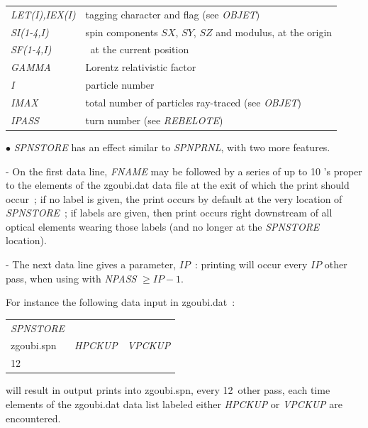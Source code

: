 \medskip

 \begin{tabular}{>{\sl}l!{~:}l}
	 LET(I),IEX(I)  &  tagging character and flag (see \textsl{OBJET}) \\   
	 SI(1-4,I) & spin components $SX$, $SY$, $SZ$  and modulus, at the origin\\
	 SF(1-4,I)   &  \id\, at the current position\\
	  GAMMA &   Lorentz relativistic factor\\
	  I  &  particle number\\
	 IMAX &  total number of particles ray-traced (see  \textsl{OBJET})\\
	 IPASS &  turn number (see \textsl{REBELOTE})\\
 \end{tabular}

\medskip

\noindent  $\bullet$   \textsl{SPNSTORE} has an effect similar to \textsl{SPNPRNL}, with two more features. 

- On the first data line, \textsl{FNAME} may be followed 
by a series of up to 10 \LABEL's proper to the elements of the zgoubi.dat data 
file at the exit of which the print should occur~; if no label is given, 
the print occurs by default at the very location of \textsl{SPNSTORE}~; 
if  labels are given, then print occurs right downstream of all optical elements wearing those labels
 (and no longer at the \textsl{SPNSTORE} location). 

- The next data line 
gives a parameter, $IP$~: printing will occur every $IP$ other pass, when 
using \REBELOTE{} with \textsl{NPASS} $ \geq IP-1$. 

For instance the following data input in zgoubi.dat~: 

\medskip

{\renewcommand{\arraystretch}{1}
\begin{tabular}{lll}
	\textsl{SPNSTORE} &  &   \\
	zgoubi.spn \index{zgoubi.fai} & \textsl{HPCKUP} & \textsl{VPCKUP}  \\
	12 &  & 
\end{tabular}}

\medskip

\noindent will result in output prints into zgoubi.spn, every 12~other 
pass, each time elements of the zgoubi.dat  data list labeled either \textsl{HPCKUP}
or \textsl{VPCKUP} are encountered.

